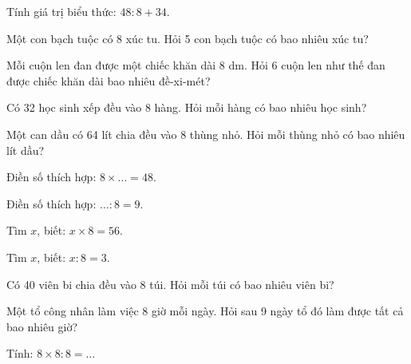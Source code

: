 \begin{ex}
Tính giá trị biểu thức: $48 : 8 + 34$.
\end{ex}

\begin{ex}
Một con bạch tuộc có 8 xúc tu. Hỏi 5 con bạch tuộc có bao nhiêu xúc tu?
\end{ex}

\begin{ex}
Mỗi cuộn len đan được một chiếc khăn dài 8 dm. Hỏi 6 cuộn len như thế đan được chiếc khăn dài bao nhiêu đề-xi-mét?
\end{ex}

\begin{ex}
Có 32 học sinh xếp đều vào 8 hàng. Hỏi mỗi hàng có bao nhiêu học sinh?
\end{ex}

\begin{ex}
Một can dầu có 64 lít chia đều vào 8 thùng nhỏ. Hỏi mỗi thùng nhỏ có bao nhiêu lít dầu?
\end{ex}

\begin{ex}
Điền số thích hợp: $8 \times \dots = 48$.
\end{ex}

\begin{ex}
Điền số thích hợp: $\dots : 8 = 9$.
\end{ex}

\begin{ex}
Tìm $x$, biết: $x \times 8 = 56$.
\end{ex}

\begin{ex}
Tìm $x$, biết: $x : 8 = 3$.
\end{ex}

\begin{ex}
Có 40 viên bi chia đều vào 8 túi. Hỏi mỗi túi có bao nhiêu viên bi?
\end{ex}

\begin{ex}
Một tổ công nhân làm việc 8 giờ mỗi ngày. Hỏi sau 9 ngày tổ đó làm được tất cả bao nhiêu giờ?
\end{ex}

\begin{ex}
Tính: $8 \times 8 : 8 = \dots$
\end{ex}
